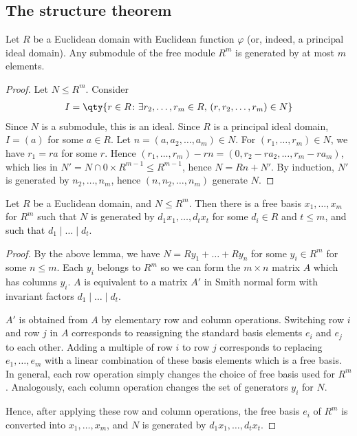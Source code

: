 \subsection{The structure theorem}
\begin{lemma}
	Let $R$ be a Euclidean domain with Euclidean function $\varphi$ (or, indeed, a principal ideal domain).
	Any submodule of the free module $R^m$ is generated by at most $m$ elements.
\end{lemma}
\begin{proof}
	Let $N \leq R^m$.
	Consider
	\begin{align*}
		I = \qty{r \in R \colon \exists r_2, \dots, r_m \in R,\, (r,r_2, \dots, r_m) \in N}
	\end{align*}
	Since $N$ is a submodule, this is an ideal.
	Since $R$ is a principal ideal domain, $I = (a)$ for some $a \in R$.
	Let $n = (a, a_2, \dots, a_m) \in N$.
	For $(r_1, \dots, r_m) \in N$, we have $r_1 = ra$ for some $r$.
	Hence $(r_1, \dots, r_m) - rn = (0,r_2 - ra_2, \dots, r_m - ra_m)$, which lies in $N' = N \cap \qty{0} \times R^{m-1} \leq R^{m-1}$, hence $N = Rn + N'$.
	By induction, $N'$ is generated by $n_2, \dots, n_m$, hence $(n, n_2, \dots, n_m)$ generate $N$.
\end{proof}
\begin{theorem}
	Let $R$ be a Euclidean domain, and $N \leq R^m$.
	Then there is a free basis $x_1, \dots, x_m$ for $R^m$ such that $N$ is generated by $d_1 x_1, \dots, d_t x_t$ for some $d_i \in R$ and $t \leq m$, and such that $d_1 \mid \dots \mid d_t$.
\end{theorem}
\begin{proof}
	By the above lemma, we have $N = R y_1 + \dots + R y_n$ for some $y_i \in R^m$ for some $n \leq m$.
	Each $y_i$ belongs to $R^m$ so we can form the $m \times n$ matrix $A$ which has columns $y_i$.
	$A$ is equivalent to a matrix $A'$ in Smith normal form with invariant factors $d_1 \mid \dots \mid d_t$.

	$A'$ is obtained from $A$ by elementary row and column operations.
	Switching row $i$ and row $j$ in $A$ corresponds to reassigning the standard basis elements $e_i$ and $e_j$ to each other.
	Adding a multiple of row $i$ to row $j$ corresponds to replacing $e_1, \dots, e_m$ with a linear combination of these basis elements which is a free basis.
	In general, each row operation simply changes the choice of free basis used for $R^m$.
	Analogously, each column operation changes the set of generators $y_i$ for $N$.

	Hence, after applying these row and column operations, the free basis $e_i$ of $R^m$ is converted into $x_1, \dots, x_m$, and $N$ is generated by $d_1 x_1, \dots, d_t x_t$.
\end{proof}
